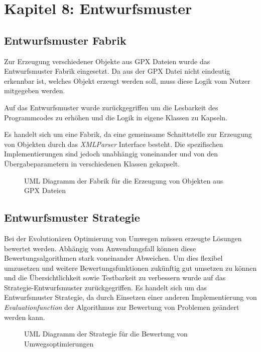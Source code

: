 \section{Kapitel 8: Entwurfsmuster}

\subsection{Entwurfsmuster Fabrik}

Zur Erzeugung verschiedener Objekte aus GPX Dateien wurde das Entwurfsmuster Fabrik eingesetzt.
Da aus der GPX Datei nicht eindeutig erkennbar ist, welches Objekt erzeugt werden soll, muss diese Logik vom Nutzer mitgegeben werden.

Auf das Entwurfsmuster wurde zurückgegriffen um die Lesbarkeit des Programmcodes zu erhöhen und die Logik in eigene Klassen zu Kapseln.

Es handelt sich um eine Fabrik, da eine gemeinsame Schnittstelle zur Erzeugung von Objekten durch das \textit{XMLParser} Interface besteht. Die spezifischen Implementierungen sind jedoch unabhängig voneinander und von den Übergabeparametern in verschiedenen Klassen gekapselt. 

\begin{figure}[H]
  \centering
  
  \caption{UML Diagramm der Fabrik für die Erzeugung von Objekten aus GPX Dateien}
\end{figure}

\subsection{Entwurfsmuster Strategie}

Bei der Evolutionären Optimierung von Umwegen müssen erzeugte Lösungen bewertet werden. Abhängig vom Anwendungsfall können diese Bewertungsalgorithmen stark voneinander Abweichen.
Um dies flexibel umzusetzen und weitere Bewertungsfunktionen zukünftig gut umsetzen zu können und die Übersichtlichkeit sowie Testbarkeit zu verbessern wurde auf das Strategie-Entwurfsmuster zurückgegriffen.
Es handelt sich um das Entwurfsmuster Strategie, da durch Einsetzen einer anderen Implementierung von \textit{Evaluationfunction} der Algorithmus zur Bewertung von Problemen geändert werden kann.

\begin{figure}[H]
  \centering
  
  \caption{UML Diagramm der Strategie für die Bewertung von Umwegsoptimierungen}
\end{figure}